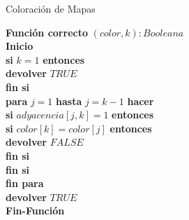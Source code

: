 \documentclass[a4paper]{article}
\begin{document}
\begin{algorithm}	
	\caption{Coloración de Mapas\label{ALG1_3}}
	\hspace{0.1cm} \textbf{Funci\'on correcto} $(color, k):Booleana$\\
	\hspace{0.1cm} \textbf{Inicio}\\
	\hspace{0.1cm} \textbf{si} $k=1$ \textbf{entonces}\\
	\hspace{1.1cm} \textbf{devolver} $TRUE$\hspace{1cm}\\
	\hspace{0.1cm} \textbf{fin si}\\
	\hspace{0.1cm} \textbf{para} $j=1$ \textbf{hasta} $j=k-1$ \textbf{hacer}\\
	\hspace{0.6cm} \textbf{si} $adyacencia[j,k]=1$ \textbf{entonces}\\
	\hspace{1.1cm} \textbf{si} $color[k]=color[j]$ \textbf{entonces}\\
	\hspace{1.6cm} \textbf{devolver} $FALSE$\hspace{1cm}\\
	\hspace{1.1cm} \textbf{fin si}\\
	\hspace{0.6cm} \textbf{fin si}\\
	\hspace{0.1cm} \textbf{fin para}\\
	\hspace{0.1cm} \textbf{devolver} $TRUE$\hspace{1cm}\\
	\hspace{0.1cm} \textbf{Fin-Función}\\	
\end{algorithm}
\end{document}
